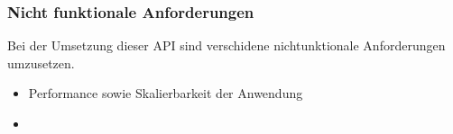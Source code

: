 \subsubsection{Nicht funktionale Anforderungen} \label{sec:N_Anforderungen}
    Bei der Umsetzung dieser API sind verschidene nichtunktionale Anforderungen umzusetzen.
    \begin{itemize}
        \item Performance sowie Skalierbarkeit der Anwendung
        \item 
    \end{itemize}